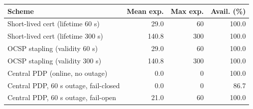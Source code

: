 \begin{tabular}{@{}lrrr@{}}
\toprule
\textbf{Scheme} & \textbf{Mean exp.} & \textbf{Max exp.} & \textbf{Avail. (\%)} \\
\midrule
Short-lived cert (lifetime 60 s) & 29.0 & 60 & 100.0 \\
Short-lived cert (lifetime 300 s) & 140.8 & 300 & 100.0 \\
OCSP stapling (validity 60 s) & 29.0 & 60 & 100.0 \\
OCSP stapling (validity 300 s) & 140.8 & 300 & 100.0 \\
Central PDP (online, no outage) & 0.0 & 0 & 100.0 \\
Central PDP, 60 s outage, fail-closed & 0.0 & 0 & 86.7 \\
Central PDP, 60 s outage, fail-open & 21.0 & 60 & 100.0 \\
\bottomrule
\end{tabular}